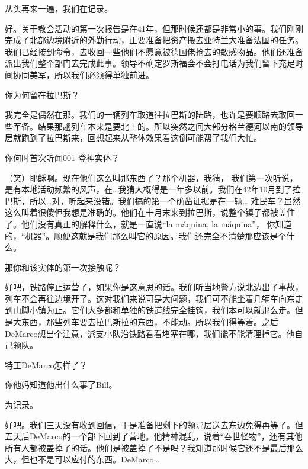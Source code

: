 \begin{scpbox}

从头再来一遍，我们在记录。

好。关于教会活动的第一次报告是在41年，但那时候还都是非常小的事。我们刚刚完成了北部边境附近的外勤行动，正要准备把资产搬去亚特兰大准备法国的任务。我们已经接到命令，去收回一些他们不愿意被德国佬抢去的敏感物品。他们还准备派出我们整个部门去完成此事。领导不确定罗斯福会不会打电话为我们留下充足时间协同美军，所以我们必须得单独前进。

你为何留在拉巴斯？

我完全是偶然在那。我们的一辆列车取道往拉巴斯的陆路，也许是要顺路去取回一些军备。结果那趟列车本来是要北上的。所以突然之间大部分格兰德河以南的领导层就跑到了拉巴斯来，回想起来从整体效果看这倒可能帮了我们大忙。

你何时首次听闻001-登神实体？

（笑）耶稣啊。现在他们这么叫那东西了？那个机器，我猜， 我们第一次听说，是有本地活动频繁的风声，在…我猜大概得是一年多以前。我们在42年10月到了拉巴斯，所以…对，听起来没错。我们搞的第一个确凿证据是在一辆… 难民车？虽然这么叫着很傻但我想是准确的。他们在十月末来到拉巴斯，说整个镇子都被盖住了。他们没有真正的解释什么，就是一直说“la máquina, la máquina”， 你知道的，“机器”。顺便这就是我们那么叫它的原因。我们还完全不清楚那应该是个什么。

那你和该实体的第一次接触呢？

好吧，铁路停止运营了，如果你是这意思的话。我们听当地警方说北边出了事故，列车不会再往边境开了。这对我们来说可是大问题，我们可不能坐着几辆车向东走到山脚小镇为止。它们大多都和单独的铁道线完全挂钩，我们本可以就那么走。但是大东西，那些列车要去拉巴斯拉的东西，不能动。所以我们得等着。之后DeMarco想出个注意，派支小队沿铁路看看堵塞在哪，我们能不能清理掉它。他自己领队。

特工DeMarco怎样了？

你他妈知道他出什么事了Bill。

为记录。

好吧。我们三天没有收到回信，于是准备把剩下的领导层送去东边免得再等了。但五天后DeMarco的一个部下回到了营地。他精神混乱，说着“吞世怪物”，还有其他所有人都被盖掉了的话。他们是被盖掉了不是吗？我知道那时候它还不是最后那么大，但也不是可以应付的东西。DeMarco…


\end{scpbox}
